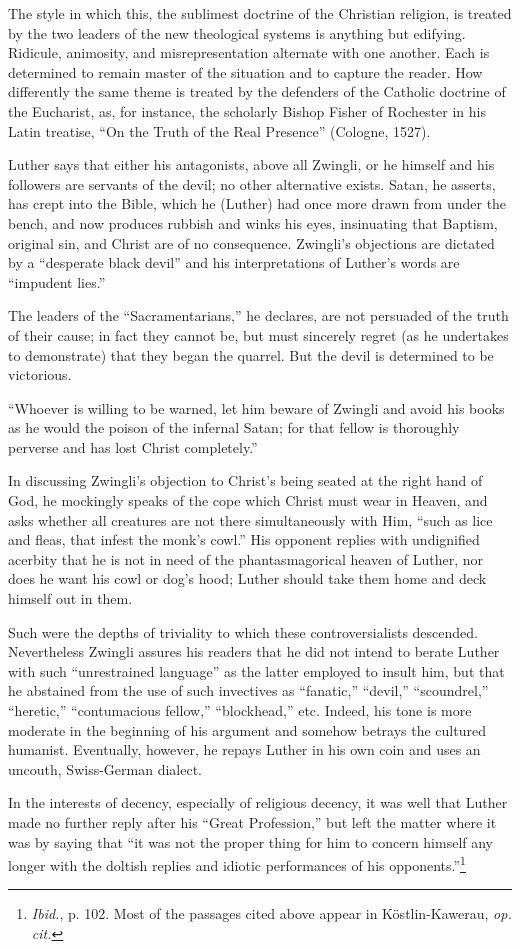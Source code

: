 The style in which this, the sublimest doctrine of the Christian
religion, is treated by the two leaders of the new theological systems
is anything but edifying. Ridicule, animosity, and misrepresentation
alternate with one another. Each is determined to remain master of the
situation and to capture the reader. How differently the same theme
is treated by the defenders of the Catholic doctrine of the Eucharist,
as, for instance, the scholarly Bishop Fisher of Rochester in his Latin
treatise, “On the Truth of the Real Presence” (Cologne, 1527).

Luther says that either his antagonists, above all Zwingli, or he himself
and his followers are servants of the devil; no other alternative exists. Satan,
he asserts, has crept into the Bible, which he (Luther) had once more
drawn from under the bench, and now produces rubbish and winks his
eyes, insinuating that Baptism, original sin, and Christ are of no consequence.
Zwingli’s objections are dictated by a “desperate black devil” and
his interpretations of Luther’s words are “impudent lies.”

The leaders of the “Sacramentarians,” he declares, are not persuaded of
the truth of their cause; in fact they cannot be, but must sincerely regret
(as he undertakes to demonstrate) that they began the quarrel. But the devil
is determined to be victorious.

“Whoever is willing to be warned, let him beware of Zwingli and avoid
his books as he would the poison of the infernal Satan; for that fellow is
thoroughly perverse and has lost Christ completely.”

In discussing Zwingli’s objection to Christ’s being seated at the right hand
of God, he mockingly speaks of the cope which Christ must wear in Heaven,
and asks whether all creatures are not there simultaneously with Him, “such
as lice and fleas, that infest the monk’s cowl.” His opponent replies with
undignified acerbity that he is not in need of the phantasmagorical heaven of
Luther, nor does he want his cowl or dog’s hood; Luther should take them
home and deck himself out in them.

Such were the depths of triviality to which these controversialists descended.
Nevertheless Zwingli assures his readers that he did not intend to
berate Luther with such “unrestrained language” as the latter employed to
insult him, but that he abstained from the use of such invectives as “fanatic,”
“devil,” “scoundrel,” ``heretic,'' “contumacious fellow,” “blockhead,” etc.
Indeed, his tone is more moderate in the beginning of his argument and
somehow betrays the cultured humanist. Eventually, however, he repays Luther
in his own coin and uses an uncouth, Swiss-German dialect.

In the interests of decency, especially of religious decency, it was
well that Luther made no further reply after his “Great Profession,”
but left the matter where it was by saying that “it was not the
proper thing for him to concern himself any longer with the doltish
replies and idiotic performances of his opponents.”\footnote
{\textit{Ibid.}, p. 102. Most of the passages cited above appear in Köstlin-Kawerau, \textit{op. cit.}}

